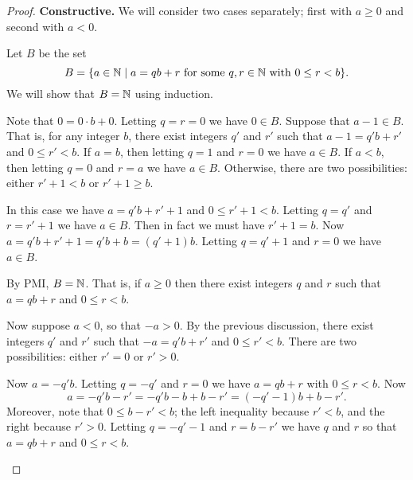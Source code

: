 \begin{proof}
\textbf{Constructive.} We will consider two cases separately; first with \(a \geq 0\) and second with \(a < 0\).

\begin{inlineproplist}
\item Let \(B\) be the set \[ B = \{ a \in \mathbb{N} \mid a = qb + r\ \mathrm{for\ some}\ q,r \in \mathbb{N}\ \mathrm{with}\ 0 \leq r < b \}. \]
We will show that \(B = \mathbb{N}\) using induction.
\begin{inductionproof}
 Note that \(0 = 0 \cdot b + 0\).
Letting \(q = r = 0\) we have \(0 \in B\).
\inductivestep Suppose that \(a-1 \in B\).
That is, for any integer \(b\), there exist integers \(q'\) and \(r'\) such that \(a-1 = q'b + r'\) and \(0 \leq r' < b\).
If \(a = b\), then letting \(q = 1\) and \(r = 0\) we have \(a \in B\).
If \(a < b\), then letting \(q = 0\) and \(r = a\) we have \(a \in B\).
Otherwise, there are two possibilities: either \(r'+1 < b\) or \(r'+1 \geq b\).
\begin{inlinecaselist}
 In this case we have \(a = q'b + r'+1\) and \(0 \leq r'+1 < b\).
Letting \(q = q'\) and \(r = r'+1\) we have \(a \in B\).
 Then in fact we must have \(r'+1 = b\).
Now \(a = q'b + r'+1 = q'b + b = (q'+1)b\).
Letting \(q = q'+1\) and \(r = 0\) we have \(a \in B\).
\end{inlinecaselist}%
\end{inductionproof}%
By PMI, \(B = \mathbb{N}\).
That is, if \(a \geq 0\) then there exist integers \(q\) and \(r\) such that \(a = qb + r\) and \(0 \leq r < b\).

\item Now suppose \(a < 0\), so that \(-a > 0\).
By the previous discussion, there exist integers \(q'\) and \(r'\) such that \(-a = q'b + r'\) and \(0 \leq r' < b\).
There are two possibilities: either \(r' = 0\) or \(r' > 0\).
\begin{inlinecaselist}
Now \(a = -q'b\).
Letting \(q = -q'\) and \(r = 0\) we have \(a = qb+r\) with \(0 \leq r < b\).
Now \[ a = -q'b - r' = -q'b - b + b - r' = (-q'-1)b + b-r'. \]
Moreover, note that \(0 \leq b-r' < b\); the left inequality because \(r' < b\), and the right because \(r' > 0\).
Letting \(q = -q'-1\) and \(r = b-r'\) we have \(q\) and \(r\) so that \(a = qb+r\) and \(0 \leq r < b\).
\end{inlinecaselist}
\end{inlineproplist}
\end{proof}

